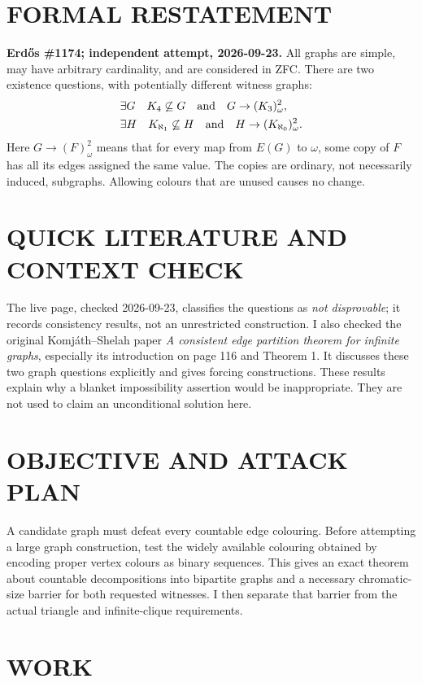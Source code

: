 \section{FORMAL RESTATEMENT}
\textbf{Erd\H{o}s \#1174; independent attempt, 2026-09-23.}
All graphs are simple, may have arbitrary cardinality, and are considered in ZFC. There are two existence questions, with potentially different witness graphs:
\[
\begin{split}
&\exists G\quad K_4\not\subseteq G
\quad\hbox{and}\quad G\to(K_3)^2_\omega,\\
&\exists H\quad K_{\aleph_1}\not\subseteq H
\quad\hbox{and}\quad H\to(K_{\aleph_0})^2_\omega.
\end{split}
\]
Here $G\to(F)^2_\omega$ means that for every map from $E(G)$ to $\omega$, some copy of $F$ has all its edges assigned the same value. The copies are ordinary, not necessarily induced, subgraphs. Allowing colours that are unused causes no change.

\section{QUICK LITERATURE AND CONTEXT CHECK}
The live page, checked 2026-09-23, classifies the questions as \emph{not disprovable}; it records consistency results, not an unrestricted construction. I also checked the original Komj\'ath--Shelah paper \emph{A consistent edge partition theorem for infinite graphs}, especially its introduction on page 116 and Theorem 1. It discusses these two graph questions explicitly and gives forcing constructions. These results explain why a blanket impossibility assertion would be inappropriate. They are not used to claim an unconditional solution here.

\section{OBJECTIVE AND ATTACK PLAN}
A candidate graph must defeat every countable edge colouring. Before attempting a large graph construction, test the widely available colouring obtained by encoding proper vertex colours as binary sequences. This gives an exact theorem about countable decompositions into bipartite graphs and a necessary chromatic-size barrier for both requested witnesses. I then separate that barrier from the actual triangle and infinite-clique requirements.

\section{WORK}

